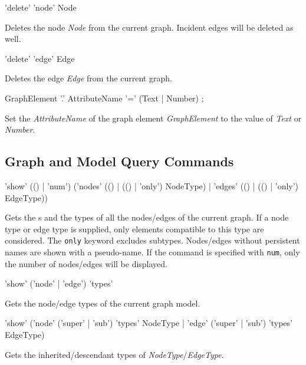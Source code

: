 \begin{rail}
  'delete' 'node' Node
\end{rail}
Deletes the node \emph{Node} from the current graph.
Incident edges will be deleted as well.

\begin{rail}
  'delete' 'edge' Edge
\end{rail}
Deletes the edge \emph{Edge} from the current graph.

\begin{rail}
  GraphElement '.' AttributeName '=' (Text | Number) ;
\end{rail}
Set the  \emph{AttributeName} of the graph element \emph{GraphElement} to the value of \emph{Text} or \emph{Number}.

  
\subsection{Graph and Model Query Commands}

\begin{rail}
  'show' (() | 'num') ('nodes' (() | (() | 'only') NodeType) | 'edges' (() | (() | 'only') EdgeType))
\end{rail}
Gets the s and the types of all the nodes/edges of the current graph. 
If a node type or edge type is supplied, only elements compatible to this type are considered. 
The \texttt{only} keyword excludes subtypes. Nodes/edges without persistent names are shown with a pseudo-name.
If the command is specified with \texttt{num}, only the number of nodes/edges will be displayed.

\begin{rail}
  'show' ('node' | 'edge') 'types'
\end{rail}
Gets the node/edge types of the current graph model.

\begin{rail}
'show' ('node' ('super' | 'sub') 'types' NodeType | 'edge' ('super' | 'sub') 'types' EdgeType)
\end{rail}
Gets the inherited/descendant types of \emph{NodeType}/\emph{EdgeType}.


